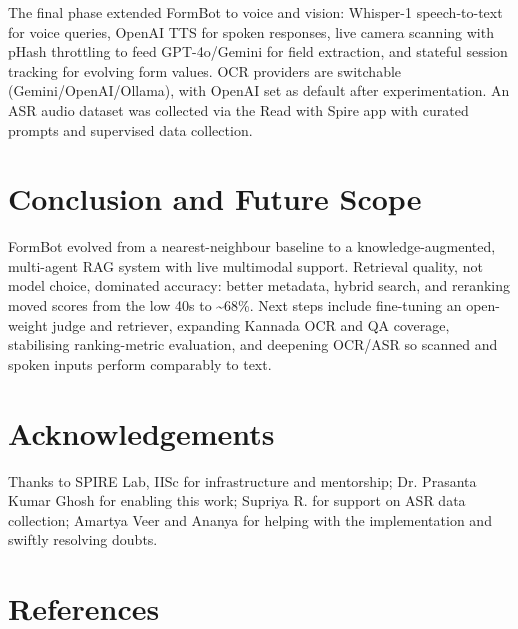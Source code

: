 \documentclass[11pt,a4paper]{article}
\begin{document}
The final phase extended FormBot to voice and vision: Whisper-1 speech-to-text for voice queries, OpenAI TTS for spoken responses, live camera scanning with pHash throttling to feed GPT-4o/Gemini for field extraction, and stateful session tracking for evolving form values. OCR providers are switchable (Gemini/OpenAI/Ollama), with OpenAI set as default after experimentation. An ASR audio dataset was collected via the Read with Spire app with curated prompts and supervised data collection.

\section{Conclusion and Future Scope}

FormBot evolved from a nearest-neighbour baseline to a knowledge-augmented, multi-agent RAG system with live multimodal support. Retrieval quality, not model choice, dominated accuracy: better metadata, hybrid search, and reranking moved scores from the low 40s to \textasciitilde68\%. Next steps include fine-tuning an open-weight judge and retriever, expanding Kannada OCR and QA coverage, stabilising ranking-metric evaluation, and deepening OCR/ASR so scanned and spoken inputs perform comparably to text.

\section{Acknowledgements}

Thanks to SPIRE Lab, IISc for infrastructure and mentorship; Dr. Prasanta Kumar Ghosh for enabling this work; Supriya R. for support on ASR data collection; Amartya Veer and Ananya for helping with the implementation and swiftly resolving doubts.

\section{References}
\end{document}
